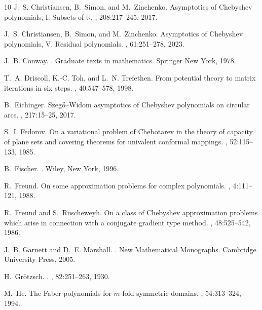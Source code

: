 \documentclass[12pt,oneside,reqno]{amsart}
\theoremstyle{definition}
\numberwithin{equation}{section}
\begin{document}
\begin{thebibliography}{10}
J.~S. Christiansen, B.~Simon, and M.~Zinchenko.
\newblock Asymptotics of {C}hebyshev polynomials, {I}. Subsets of {$\mathbb{R}$}.
, 208:217--245, 2017.

J.~S. Christiansen, B.~Simon, and M.~Zinchenko.
\newblock Asymptotics of {C}hebyshev polynomials, {V}. Residual polynomials.
, 61:251--278, 2023.

J.~B. Conway.
.
\newblock Graduate texts in mathematics. Springer New York, 1978.

T.~A. Driscoll, K.-C. Toh, and L.~N. Trefethen.
\newblock From potential theory to matrix iterations in six steps.
, 40:547--578, 1998.

B.~Eichinger.
\newblock Szeg{\H{o}}--{W}idom asymptotics of {C}hebyshev polynomials on circular arcs.
, 217:15--25, 2017.

S.~I. Fedorov.
\newblock On a variational problem of {C}hebotarev in the theory of capacity of plane sets and covering theorems for univalent conformal mappings.
, 52:115--133, 1985.

B.~Fischer.
.
\newblock Wiley, New York, 1996.

R.~Freund.
\newblock On some approximation problems for complex polynomials.
, 4:111--121, 1988.

R.~Freund and S.~Ruscheweyh.
\newblock On a class of {C}hebyshev approximation problems which arise in connection with a conjugate gradient type method.
, 48:525--542, 1986.

J.~B. Garnett and D.~E. Marshall.
.
\newblock New Mathematical Monographs. Cambridge University Press, 2005.

H.~Gr{\"{o}}tzsch.
.
, 82:251--263, 1930.

M.~He.
\newblock The {F}aber polynomials for $m$-fold symmetric domains.
, 54:313--324, 1994.


\end{thebibliography}
\end{document}
